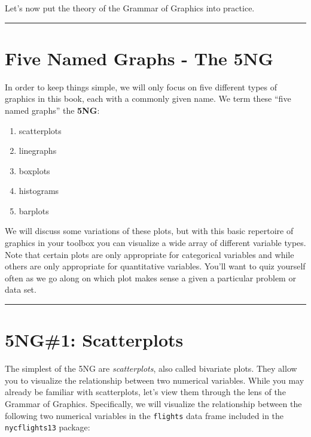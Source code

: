 \documentclass[12pt, krantz2,]{krantz}
\providecommand{\tightlist}{%
  \setlength{\itemsep}{0pt}\setlength{\parskip}{0pt}}
\begin{document}
Let's now put the theory of the Grammar of Graphics into practice.

\begin{center}\rule{0.5\linewidth}{\linethickness}\end{center}

\hypertarget{FiveNG}{%
\section{Five Named Graphs - The 5NG}\label{FiveNG}}

In order to keep things simple, we will only focus on five different types of graphics in this book, each with a commonly given name. We term these ``five named graphs'' the \textbf{5NG}:

\begin{enumerate}
\def\labelenumi{\arabic{enumi}.}
\tightlist
\item
  scatterplots
\item
  linegraphs
\item
  boxplots
\item
  histograms
\item
  barplots
\end{enumerate}

We will discuss some variations of these plots, but with this basic repertoire of graphics in your toolbox you can visualize a wide array of different variable types. Note that certain plots are only appropriate for categorical variables and while others are only appropriate for quantitative variables. You'll want to quiz yourself often as we go along on which plot makes sense a given a particular problem or data set.

\begin{center}\rule{0.5\linewidth}{\linethickness}\end{center}

\hypertarget{scatterplots}{%
\section{5NG\#1: Scatterplots}\label{scatterplots}}

The simplest of the 5NG are \emph{scatterplots}, also called bivariate plots. They allow you to visualize the relationship between two numerical variables. While you may already be familiar with scatterplots, let's view them through the lens of the Grammar of Graphics. Specifically, we will visualize the relationship between the following two numerical variables in the \texttt{flights} data frame included in the \texttt{nycflights13} package:
\end{document}
